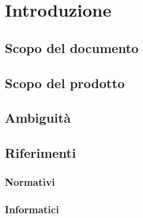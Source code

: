 \section{Introduzione}

\subsection{Scopo del documento}

\subsection{Scopo del prodotto}

\subsection{Ambiguità}

\subsection{Riferimenti}
	\subsubsection{Normativi}
	\subsubsection{Informatici}